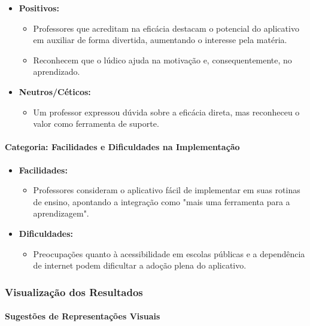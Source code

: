 \begin{itemize}
    \item \textbf{Positivos:}
    \begin{itemize}
        \item Professores que acreditam na eficácia destacam o potencial do aplicativo em auxiliar de forma divertida, aumentando o interesse pela matéria.
        \item Reconhecem que o lúdico ajuda na motivação e, consequentemente, no aprendizado.
    \end{itemize}
    \item \textbf{Neutros/Céticos:}
    \begin{itemize}
        \item Um professor expressou dúvida sobre a eficácia direta, mas reconheceu o valor como ferramenta de suporte.
    \end{itemize}
\end{itemize}

\paragraph{Categoria: Facilidades e Dificuldades na Implementação}

\begin{itemize}
    \item \textbf{Facilidades:}
    \begin{itemize}
        \item Professores consideram o aplicativo fácil de implementar em suas rotinas de ensino, apontando a integração como "mais uma ferramenta para a aprendizagem".
    \end{itemize}
    \item \textbf{Dificuldades:}
    \begin{itemize}
        \item Preocupações quanto à acessibilidade em escolas públicas e a dependência de internet podem dificultar a adoção plena do aplicativo.
    \end{itemize}
\end{itemize}

\subsubsection{Visualização dos Resultados}

\paragraph{Sugestões de Representações Visuais}

